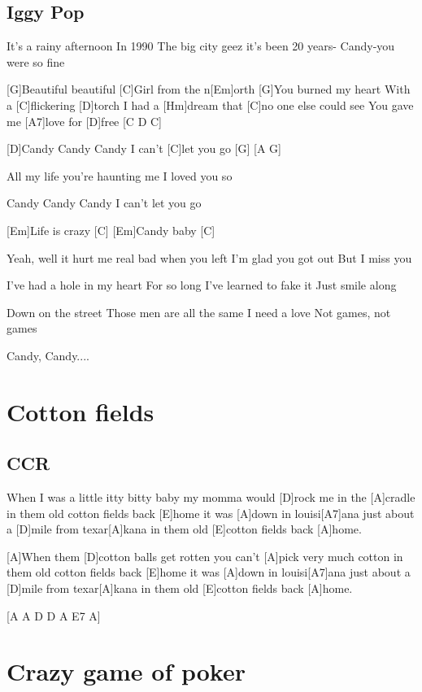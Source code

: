\documentclass[a4paper,12pt]{article}
\begin{document}
\begin{multicols}{2}
\subsection*{Iggy Pop}
\begin{guitar}
[G  C  Em]

It's a rainy afternoon 
In 1990
The big city geez it's been 20 years-
Candy-you were so fine


[G]Beautiful beautiful
[C]Girl from the n[Em]orth
[G]You burned my heart
With a [C]flickering [D]torch
I had a [Hm]dream that [C]no one else could see
You gave me [A7]love for [D]free [C D C]


[D]Candy Candy Candy
I can't [C]let you go [G] [A G]

All my life you're haunting me
I loved you so

Candy Candy Candy 
I can't let you go

[Em]Life is crazy [C]
[Em]Candy baby [C]


Yeah, well it hurt me real bad when you left
I'm glad you got out
But I miss you


I've had a hole in my heart
For so long
I've learned to fake it 
Just smile along
	    
    
Down on the street
Those men are all the same
I need a love
Not games, not games


Candy, Candy....

\end{guitar}
\section{Cotton fields}
\subsection*{CCR}
\begin{guitar}
[A]When I was a little itty bitty baby
my momma would [D]rock me in the [A]cradle
in them old cotton fields back [E]home
it was [A]down in louisi[A7]ana
just about a [D]mile from texar[A]kana
in them old [E]cotton fields back [A]home.

	
[A]When them [D]cotton balls get rotten
you can't [A]pick very much cotton
in them old cotton fields back [E]home
it was [A]down in louisi[A7]ana
just about a [D]mile from texar[A]kana
in them old [E]cotton fields back [A]home.


[A A D D A E7 A]

\end{guitar}
\section{Crazy game of poker}

\end{multicols}
\end{document}
